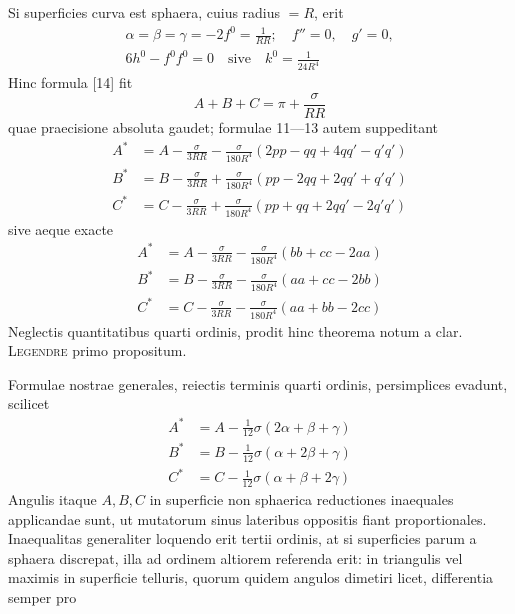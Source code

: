 \indent Si superficies curva est sphaera, cuius radius \(=R\), erit
\[
\begin{gathered}
\alpha=\beta=\gamma=-2f^0=\frac{1}{RR};\quad f''=0,\quad g'=0,\\
6h^0-f^0f^0=0\quad\text{sive}\quad k^0=\frac{1}{24R^4}
\end{gathered}
\]
Hinc formula [14] fit
\[
A+B+C=\pi+\frac{\sigma}{RR}
\]
quae praecisione absoluta gaudet; formulae 11—13 autem suppeditant
\[
\begin{aligned}
A^*&=A-\frac{\sigma}{3RR}-\frac{\sigma}{180R^4}(2pp-qq+4qq'-q'q')\\
B^*&=B-\frac{\sigma}{3RR}+\frac{\sigma}{180R^4}(pp-2qq+2qq'+q'q')\\
C^*&=C-\frac{\sigma}{3RR}+\frac{\sigma}{180R^4}(pp+qq+2qq'-2q'q')
\end{aligned}
\]
sive aeque exacte
\[
\begin{aligned}
A^*&=A-\frac{\sigma}{3RR}-\frac{\sigma}{180R^4}(bb+cc-2aa)\\
B^*&=B-\frac{\sigma}{3RR}-\frac{\sigma}{180R^4}(aa+cc-2bb)\\
C^*&=C-\frac{\sigma}{3RR}-\frac{\sigma}{180R^4}(aa+bb-2cc)
\end{aligned}
\]
Neglectis quantitatibus quarti ordinis, prodit hinc theorema notum a clar. \textsc{Legendre} primo propositum.

\indent Formulae nostrae generales, reiectis terminis quarti ordinis, persimplices evadunt, scilicet
\[
\begin{aligned}
A^*&=A-\tfrac{1}{12}\sigma(2\alpha+\beta+\gamma)\\
B^*&=B-\tfrac{1}{12}\sigma(\alpha+2\beta+\gamma)\\
C^*&=C-\tfrac{1}{12}\sigma(\alpha+\beta+2\gamma)
\end{aligned}
\]
Angulis itaque \(A,B,C\) in superficie non sphaerica reductiones inaequales applicandae sunt, ut mutatorum sinus lateribus oppositis fiant proportionales. Inaequalitas generaliter loquendo erit tertii ordinis, at si superficies parum a sphaera discrepat, illa ad ordinem altiorem referenda erit: in triangulis vel maximis in superficie telluris, quorum quidem angulos dimetiri licet, differentia semper pro
